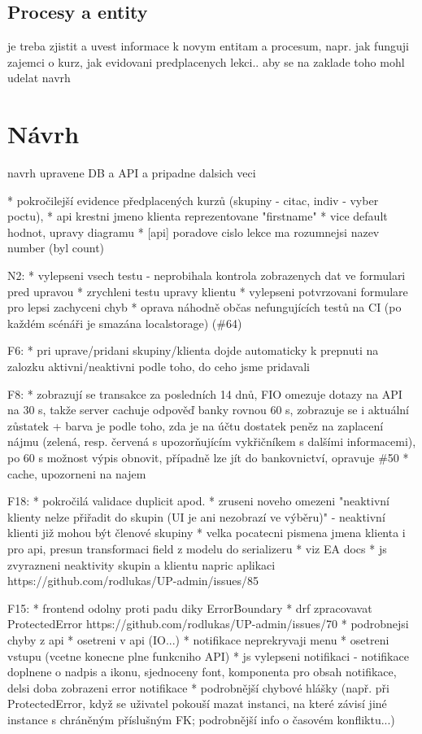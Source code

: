 \section{Procesy a entity}
je treba zjistit a uvest informace k novym entitam a procesum, napr. jak funguji zajemci o kurz, jak evidovani predplacenych lekci.. aby se na zaklade toho mohl udelat navrh


\chapter{Návrh}
navrh upravene DB a API a pripadne dalsich veci

* pokročilejší evidence předplacených kurzů (skupiny - citac, indiv - vyber poctu), 
* api krestni jmeno klienta reprezentovane "firstname"
* vice default hodnot, upravy diagramu
* [api] poradove cislo lekce ma rozumnejsi nazev number (byl count)

N2: 
* vylepseni vsech testu - neprobihala kontrola zobrazenych dat ve formulari pred upravou
* zrychleni testu upravy klientu
* vylepseni potvrzovani formulare pro lepsi zachyceni chyb
* oprava náhodně občas nefungujících testů na CI (po každém scénáři je smazána localstorage) (\#64)

F6: 
* pri uprave/pridani skupiny/klienta dojde automaticky k prepnuti na zalozku aktivni/neaktivni podle toho, do ceho jsme pridavali

F8:
* zobrazují se transakce za posledních 14 dnů, FIO omezuje dotazy na API na 30 s, takže server cachuje odpověď banky rovnou 60 s, zobrazuje se i aktuální zůstatek + barva je podle toho, zda je na účtu dostatek peněz na zaplacení nájmu (zelená, resp. červená s upozorňujícím vykřičníkem s dalšími informacemi), po 60 s možnost výpis obnovit, případně lze jít do bankovnictví, opravuje \#50
* cache, upozorneni na najem

F18:
* pokročilá validace duplicit apod.
* zruseni noveho omezeni "neaktivní klienty nelze přiřadit do skupin (UI je ani nezobrazí ve výběru)" - neaktivní klienti již mohou být členové skupiny
* velka pocatecni pismena jmena klienta i pro api, presun transformaci field z modelu do serializeru
* viz EA docs
* js zvyrazneni neaktivity skupin a klientu napric aplikaci https://github.com/rodlukas/UP-admin/issues/85

F15:
* frontend odolny proti padu diky ErrorBoundary
* drf zpracovavat ProtectedError https://github.com/rodlukas/UP-admin/issues/70
* podrobnejsi chyby z api
* osetreni v api (IO...)
* notifikace neprekryvaji menu
* osetreni vstupu (vcetne konecne plne funkcniho API)
* js vylepseni notifikaci - notifikace doplnene o nadpis a ikonu, sjednoceny font, komponenta pro obsah notifikace, delsi doba zobrazeni error notifikace
* podrobnější chybové hlášky (např. při ProtectedError, když se uživatel pokouší mazat instanci, na které závisí jiné instance s chráněným příslušným FK; podrobnější info o časovém konfliktu...)

